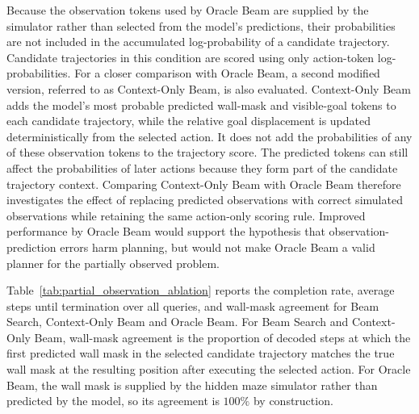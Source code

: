 ﻿\documentclass[12pt,a4paper]{article}
\theoremstyle{definition}
\begin{document}
Because the observation tokens used by Oracle Beam are supplied by the simulator rather than selected
from the model's predictions, their probabilities are not included in the accumulated log-probability
of a candidate trajectory. Candidate trajectories in this condition are scored using only action-token
log-probabilities. For a closer comparison with Oracle Beam, a second modified version, referred to as
Context-Only Beam, is also evaluated. Context-Only Beam adds the model's most probable predicted
wall-mask and visible-goal tokens to each candidate trajectory, while the relative goal displacement is
updated deterministically from the selected action. It does not add the probabilities of any of these
observation tokens to the trajectory score. The predicted tokens can still affect the probabilities of later
actions because they form part of the candidate trajectory context. Comparing Context-Only Beam with
Oracle Beam therefore investigates the effect of replacing predicted observations with correct simulated
observations while retaining the same action-only scoring rule. Improved performance by Oracle Beam would
support the hypothesis that observation-prediction errors harm planning, but would not make Oracle Beam
a valid planner for the partially observed problem.

\begin{table}[H]
\centering
\caption{Observation-ablation results on the 1,196 partially observed fold-$1$ evaluation queries. Average steps until termination are calculated over all queries.}
\label{tab:partial_observation_ablation}
\footnotesize
{}
\normalsize
\end{table}

Table~\ref{tab:partial_observation_ablation} reports the completion rate, average steps until termination over
all queries, and wall-mask agreement for Beam Search, Context-Only Beam and Oracle Beam.
For Beam Search and Context-Only Beam, wall-mask agreement is the proportion of decoded steps at which
the first predicted wall mask in the selected candidate trajectory matches the true wall mask at the
resulting position after executing the selected action. For Oracle Beam, the wall mask is supplied by
the hidden maze simulator rather than predicted by the model, so its agreement is $100\%$ by construction.
\end{document}

